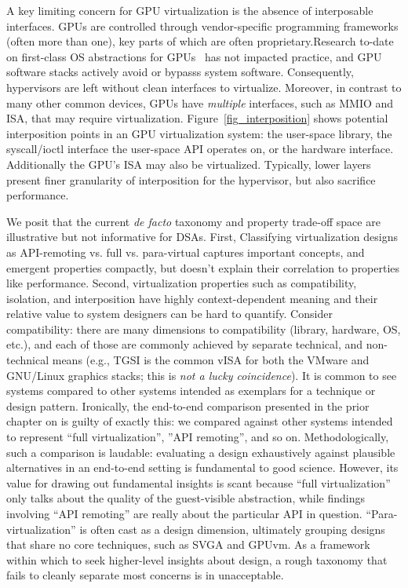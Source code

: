 A key limiting concern for GPU virtualization is the absence of interposable
interfaces. GPUs are controlled through vendor-specific programming frameworks
(often more than one), key parts of which are often proprietary.Research
to-date on first-class OS abstractions for GPUs~\cite{ptask, dandelion,
silberstein2013gpufs,timegraph, gdev, gpunet} has not impacted practice, and
GPU software stacks actively avoid or bypasss system software. Consequently,
hypervisors are left without clean interfaces to virtualize. Moreover, in
contrast to many other common devices, GPUs have \emph{multiple} interfaces,
such as MMIO and ISA, that may require virtualization.
Figure~\ref{fig_interposition} shows potential interposition points in an GPU
virtualization system: the user-space library, the syscall/ioctl interface
the user-space API operates on, or the hardware interface. Additionally the
GPU's ISA may also be virtualized. Typically, lower layers present finer
granularity of interposition for the hypervisor, but also sacrifice
performance.

We posit that the current \emph{de facto} taxonomy and property trade-off
space are illustrative but not informative for DSAs.
First, Classifying virtualization designs as API-remoting vs. full vs.
para-virtual captures important concepts, and emergent properties compactly,
but doesn't explain their correlation to properties like performance.
Second, virtualization properties such as compatibility, isolation, and
interposition have highly context-dependent meaning and their relative value
to system designers can be hard to quantify.
Consider compatibility: there are many dimensions to compatibility (library,
hardware, OS, etc.), and each of those are commonly achieved by separate
technical, and non-technical means (e.g., TGSI is the common vISA for both the
VMware and GNU/Linux graphics stacks; this is \emph{not a lucky coincidence}).
It is common to see systems compared to other systems intended as exemplars
for a technique or design pattern. Ironically, the end-to-end comparison
presented in the prior chapter on \Trillium is guilty of exactly this: we
compared \Trillium against other systems intended to represent ``full
virtualization'', ''API remoting'', and so on.
Methodologically, such a comparison is laudable: evaluating a design
exhaustively against plausible alternatives in an end-to-end setting is
fundamental to good science. However, its value for drawing out fundamental
insights is scant because ``full virtualization'' only talks about the quality
of the guest-visible abstraction, while findings involving ``API remoting''
are really about the particular API in question. ``Para-virtualization'' is
often cast as a design dimension, ultimately grouping designs that share no
core techniques, such as SVGA and GPUvm. As a framework within which to seek
higher-level insights about design, a rough taxonomy that fails to cleanly
separate most concerns is in unacceptable.

